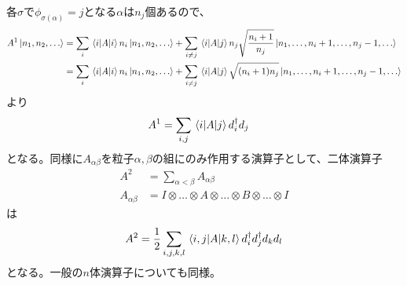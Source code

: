     各$\sigma$で$\phi_{\sigma(\alpha)} = j$となる$\alpha$は$n_j$個あるので、
    \begin{align*}
        A^1\ket{n_1, n_2, \dots}
            &= \sum_i \mel{i}{A}{i} n_i\ket{n_1, n_2, \dots} + \sum_{i \neq j} \mel{i}{A}{j} n_j\sqrt{\frac{n_i + 1}{n_j}}\ket{n_1, \dots, n_i + 1, \dots, n_j - 1, \dots}\\
            &= \sum_i \mel{i}{A}{i} n_i\ket{n_1, n_2, \dots} + \sum_{i \neq j} \mel{i}{A}{j} \sqrt{(n_i + 1)n_j}\ket{n_1, \dots, n_i + 1, \dots, n_j - 1, \dots}
    \end{align*}
    より
    \begin{align*}
        A^1 &= \sum_{i, j} \mel{i}{A}{j} d_i^\dagger d_j
    \end{align*}
    となる。同様に$A_{\alpha\beta}$を粒子$\alpha, \beta$の組にのみ作用する演算子として、二体演算子
    \begin{align*}
        A^2 &= \sum_{\alpha < \beta} A_{\alpha\beta}\\
        A_{\alpha\beta} &= I \otimes \dots \otimes A \otimes \dots \otimes B \otimes \dots \otimes I
    \end{align*}
    は
    \begin{align*}
        A^2 = \frac{1}{2}\sum_{i, j, k, l} \mel{i,j}{A}{k,l} d_i^\dagger d_j^\dagger d_k d_l
    \end{align*}
    となる。一般の$n$体演算子についても同様。
    
